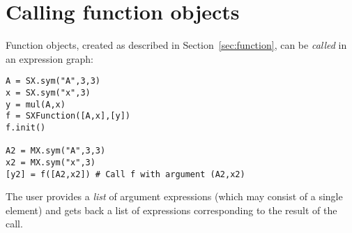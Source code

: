 \documentclass[a4paper,12pt]{book}
\newcommand{\CasADi}{\texttt{CasADi}\xspace}
\newcounter{pytexcount}
\newcounter{pytexsubcount}
\renewenvironment{pytex}
{\addtocounter{pytexsubcount}{1}%
\begin{rawhtml}
<div style="color: black; background-color: \#b9c8db;  border-style: dotted; border-width: 1px; padding:2px;padding-left:1em" >
<pre>
\end{rawhtml}
}%
{\begin{rawhtml}
</pre>
</div>
<div style="color: black; background-color: \#fffff;  border-style: solid; border-width: 1px; padding:2px;padding-left:1em;margin-left:1em;" >\end{rawhtml}%
\verbatiminputeval{pytex_\alph{pytexcount}_\arabic{pytexsubcount}.log}%
\begin{rawhtml}
</div>
\end{rawhtml}
}
\begin{document}
\section{Calling function objects}
Function objects, created as described in Section~\ref{sec:function}, can be \emph{called} in an expression graph:
\begin{verbatim}
A = SX.sym("A",3,3)
x = SX.sym("x",3)
y = mul(A,x)
f = SXFunction([A,x],[y])
f.init()

A2 = MX.sym("A",3,3)
x2 = MX.sym("x",3)
[y2] = f([A2,x2]) # Call f with argument (A2,x2)
\end{verbatim}
The user provides a \emph{list} of argument expressions (which may consist of a single element) and gets back a list of expressions corresponding to the result of the call.







\end{document}
